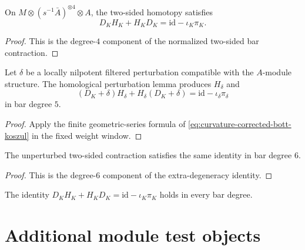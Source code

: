 \begin{proposition}
\label{prop:tbsp-homotopy-n4-valpha1}
On
\(M\otimes(s^{-1}\bar A)^{\otimes4}\otimes A\), the two-sided homotopy
satisfies
\begin{equation}\label{eq:tbsp-homotopy-n4}
 D_KH_K+H_KD_K=\mathrm{id}-\iota_K\pi_K .
\end{equation}
\end{proposition}

\begin{proof}
This is the degree-\(4\) component of the normalized two-sided bar
contraction.
\end{proof}

\begin{proposition}
\label{prop:tbsp-homotopy-n5-valpha1}
Let \(\delta\) be a locally nilpotent filtered perturbation compatible
with the \(A\)-module structure.  The homological perturbation lemma
produces \(H_\delta\) and
\begin{equation}\label{eq:tbsp-homotopy-n5}
 (D_K+\delta)H_\delta+H_\delta(D_K+\delta)
 =\mathrm{id}-\iota_\delta\pi_\delta
\end{equation}
in bar degree \(5\).
\end{proposition}

\begin{proof}
Apply the finite geometric-series formula of
\eqref{eq:curvature-corrected-bott-koszul} in the fixed weight window.
\end{proof}

\begin{proposition}
\label{prop:tbsp-homotopy-n6-valpha1}
The unperturbed two-sided contraction satisfies the same identity in
bar degree \(6\).
\end{proposition}

\begin{proof}
This is the degree-\(6\) component of the extra-degeneracy identity.
\end{proof}

\begin{corollary}
\label{cor:tbsp-homotopy-all-n-valpha1}
The identity
\(D_KH_K+H_KD_K=\mathrm{id}-\iota_K\pi_K\)
holds in every bar degree.
\end{corollary}

\section{Additional module test objects}
\label{sec:tbsp-additional-comodules}

